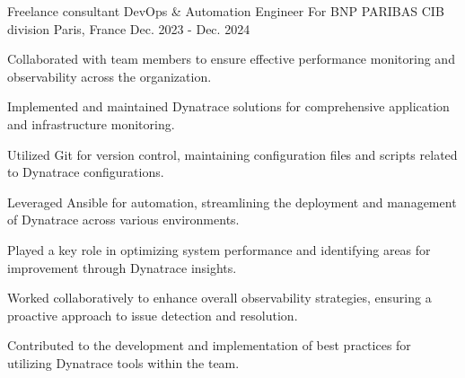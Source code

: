 
\begin{cventries}

\cventry
{Freelance consultant DevOps \& Automation Engineer} %
{For BNP PARIBAS CIB division} %
{Paris, France} %
{Dec. 2023 - Dec. 2024} %
{
  \begin{cvitems} %
    \item {Collaborated with team members to ensure effective performance monitoring and observability across the organization.}
    \item {Implemented and maintained Dynatrace solutions for comprehensive application and infrastructure monitoring.}
    \item {Utilized Git for version control, maintaining configuration files and scripts related to Dynatrace configurations.}
    \item {Leveraged Ansible for automation, streamlining the deployment and management of Dynatrace across various environments.}
    \item {Played a key role in optimizing system performance and identifying areas for improvement through Dynatrace insights.}
    \item {Worked collaboratively to enhance overall observability strategies, ensuring a proactive approach to issue detection and resolution.}
    \item {Contributed to the development and implementation of best practices for utilizing Dynatrace tools within the team.}
  \end{cvitems}
}


\end{cventries}
